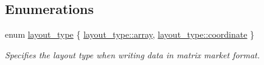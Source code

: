 \subsection*{Enumerations}
\begin{DoxyCompactItemize}
\item 
enum \hyperlink{namespacegko_ae749a5ea11a93c1bcc9158d9a6e9fb68}{layout\+\_\+type} \{ \hyperlink{namespacegko_ae749a5ea11a93c1bcc9158d9a6e9fb68af1f713c9e000f5d3f280adbd124df4f5}{layout\+\_\+type\+::array}, 
\hyperlink{namespacegko_ae749a5ea11a93c1bcc9158d9a6e9fb68af5d7aa3ba4929cc12dc51a92c59fabd3}{layout\+\_\+type\+::coordinate}
 \}\begin{DoxyCompactList}\small\item\em Specifies the layout type when writing data in matrix market format. \end{DoxyCompactList}
\end{DoxyCompactItemize}
